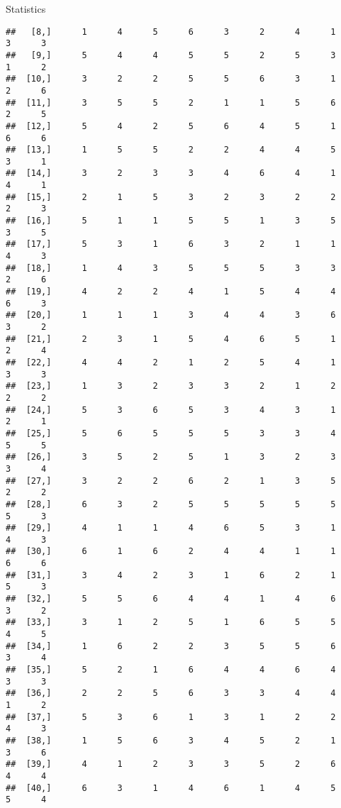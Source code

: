 \documentclass[
  ignorenonframetext,
]{beamer}
\begin{document}
\begin{frame}[fragile]{Statistics}
\begin{verbatim}
##   [8,]      1      4      5      6      3      2      4      1      3      3
##   [9,]      5      4      4      5      5      2      5      3      1      2
##  [10,]      3      2      2      5      5      6      3      1      2      6
##  [11,]      3      5      5      2      1      1      5      6      2      5
##  [12,]      5      4      2      5      6      4      5      1      6      6
##  [13,]      1      5      5      2      2      4      4      5      3      1
##  [14,]      3      2      3      3      4      6      4      1      4      1
##  [15,]      2      1      5      3      2      3      2      2      2      3
##  [16,]      5      1      1      5      5      1      3      5      3      5
##  [17,]      5      3      1      6      3      2      1      1      4      3
##  [18,]      1      4      3      5      5      5      3      3      2      6
##  [19,]      4      2      2      4      1      5      4      4      6      3
##  [20,]      1      1      1      3      4      4      3      6      3      2
##  [21,]      2      3      1      5      4      6      5      1      2      4
##  [22,]      4      4      2      1      2      5      4      1      3      3
##  [23,]      1      3      2      3      3      2      1      2      2      2
##  [24,]      5      3      6      5      3      4      3      1      2      1
##  [25,]      5      6      5      5      5      3      3      4      5      5
##  [26,]      3      5      2      5      1      3      2      3      3      4
##  [27,]      3      2      2      6      2      1      3      5      2      2
##  [28,]      6      3      2      5      5      5      5      5      5      3
##  [29,]      4      1      1      4      6      5      3      1      4      3
##  [30,]      6      1      6      2      4      4      1      1      6      6
##  [31,]      3      4      2      3      1      6      2      1      5      3
##  [32,]      5      5      6      4      4      1      4      6      3      2
##  [33,]      3      1      2      5      1      6      5      5      4      5
##  [34,]      1      6      2      2      3      5      5      6      3      4
##  [35,]      5      2      1      6      4      4      6      4      3      3
##  [36,]      2      2      5      6      3      3      4      4      1      2
##  [37,]      5      3      6      1      3      1      2      2      4      3
##  [38,]      1      5      6      3      4      5      2      1      3      6
##  [39,]      4      1      2      3      3      5      2      6      4      4
##  [40,]      6      3      1      4      6      1      4      5      5      4

\end{verbatim}
\end{frame}
\end{document}
